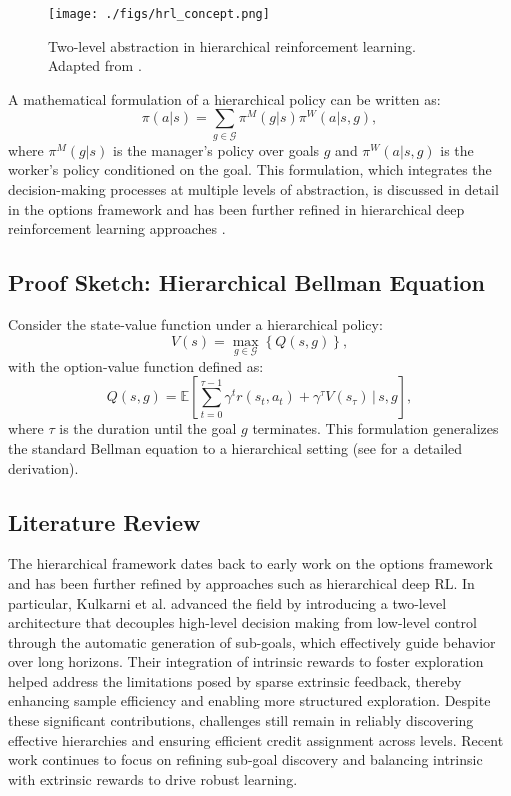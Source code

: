 \documentclass[12pt,a4paper,twoside,openany]{book}
\begin{document}
\begin{figure}[h]
\centering
\texttt{[image: ./figs/hrl\_concept.png]}
\captionsetup{font=small}
\caption{Two-level abstraction in hierarchical reinforcement learning. Adapted from \cite{Huang2021}.}
\label{fig:hrl_concept}
\end{figure}

A mathematical formulation of a hierarchical policy can be written as:
\begin{equation}
\pi(a|s) = \sum_{g \in \mathcal{G}} \pi^M(g|s) \pi^W(a|s,g),
\label{eq:hierarchical_policy}
\end{equation}
where \(\pi^M(g|s)\) is the manager’s policy over goals \(g\) and \(\pi^W(a|s,g)\) is the worker’s policy conditioned on the goal. This formulation, which integrates the decision-making processes at multiple levels of abstraction, is discussed in detail in the options framework \cite{Sutton1999} and has been further refined in hierarchical deep reinforcement learning approaches \cite{Kulkarni2016}.

\subsection*{Proof Sketch: Hierarchical Bellman Equation}

Consider the state-value function under a hierarchical policy:
\[
V(s) = \max_{g \in \mathcal{G}} \left\{ Q(s,g) \right\},
\]
with the option-value function defined as:
\[
Q(s,g) = \mathbb{E}\left[ \sum_{t=0}^{\tau-1} \gamma^t r(s_t, a_t) + \gamma^\tau V(s_{\tau}) \,\Big|\, s, g \right],
\]
where \(\tau\) is the duration until the goal \(g\) terminates. This formulation generalizes the standard Bellman equation to a hierarchical setting (see \cite{Sutton1999} for a detailed derivation).

\subsection*{Literature Review}

The hierarchical framework dates back to early work on the options framework \cite{Sutton1999} and has been further refined by approaches such as hierarchical deep RL. In particular, Kulkarni et al.\cite{Kulkarni2016} advanced the field by introducing a two-level architecture that decouples high-level decision making from low-level control through the automatic generation of sub-goals, which effectively guide behavior over long horizons. Their integration of intrinsic rewards to foster exploration helped address the limitations posed by sparse extrinsic feedback, thereby enhancing sample efficiency and enabling more structured exploration. Despite these significant contributions, challenges still remain in reliably discovering effective hierarchies and ensuring efficient credit assignment across levels. Recent work continues to focus on refining sub-goal discovery and balancing intrinsic with extrinsic rewards to drive robust learning.
\end{document}
